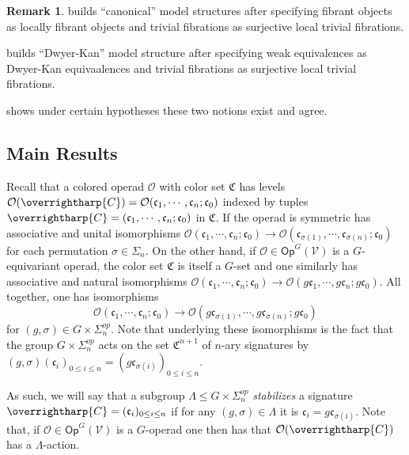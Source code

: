 \documentclass[a4paper,10pt
,draft
]{article}%
\numberwithin{equation}{section}
\numberwithin{figure}{section}
\theoremstyle{definition} %
\newtheorem{remark}[equation]{Remark}%
\newcommand{\vect}[1]{\text{\overrightharp{\ensuremath{#1}}}}
\newcommand{\V}{\ensuremath{\mathcal V}}
\renewcommand{\O}{\ensuremath{\mathcal O}}
\newcommand{\1}{\ensuremath{\mathbbm 1}}%
\begin{document}
  \begin{remark}
        \cite{BM13} builds ``canonical'' model structures after specifying
        fibrant objects as locally fibrant objects and
        trivial fibrations as surjective local trivial fibrations.
        
        \cite{Mur15} builds ``Dwyer-Kan'' model structure after specifying
        weak equivalences as Dwyer-Kan equivaalences and
        trivial fibrations as surjective local trivial fibrations.
        
        \cite{Sta14} shows under certain hypotheses these two notions exist and agree.
\end{remark}





\subsection{Main Results}


Recall that a colored operad $\O$
with color set $\mathfrak{C}$ has levels 
$
\O(\vect{C})=
\O(\mathfrak{c}_1,\cdots,\mathfrak{c}_n;\mathfrak{c}_0)$
indexed by tuples 
$\vect{C} = (\mathfrak{c}_1,\cdots,\mathfrak{c}_n;\mathfrak{c}_0)$
in $\mathfrak{C}$.
If the operad is symmetric has associative and unital isomorphisms
$
\O(\mathfrak{c}_1,\cdots,\mathfrak{c}_n;\mathfrak{c}_0) \to 
\O(\mathfrak{c}_{\sigma(1)},\cdots,\mathfrak{c}_{\sigma(n)};\mathfrak{c}_0)
$
for each permutation $\sigma \in \Sigma_n$.
On the other hand, if 
$\O \in \mathsf{Op}^G(\V)$
is a $G$-equivariant operad, 
the color set $\mathfrak{C}$ is itself a $G$-set
and one similarly has associative and natural isomorphisms
$
\O(\mathfrak{c}_1,\cdots,\mathfrak{c}_n;\mathfrak{c}_0) \to 
\O(g\mathfrak{c}_{1},\cdots,g\mathfrak{c}_{n};g\mathfrak{c}_0)
$.
All together, one has isomorphisms
\[
\O(\mathfrak{c}_1,\cdots,\mathfrak{c}_n;\mathfrak{c}_0)
\to 
\O(g \mathfrak{c}_{\sigma(1)},\cdots,g \mathfrak{c}_{\sigma(n)};g\mathfrak{c}_0)
\]
for $(g,\sigma) \in G \times \Sigma_n^{op}$.
Note that underlying these isomorphisms is the fact that
the group
$G \times \Sigma_n^{op}$
acts on the set $\mathfrak{C}^{n+1}$ of $n$-ary signatures by 
$(g,\sigma) (\mathfrak{c}_i)_{0\leq i \leq n}
= (g \mathfrak{c}_{\sigma(i)})_{0\leq i \leq n}$.

As such, we will say that a subgroup 
$\Lambda \leq G \times \Sigma_n^{op}$
\emph{stabilizes} a signature $\vect{C}=(\mathfrak{c}_i)_{0 \leq i \leq n}$
if for any 
$(g,\sigma) \in \Lambda$ it is 
$\mathfrak{c}_i = g \mathfrak{c}_{\sigma(i)}$.
Note that, if $\O \in \mathsf{Op}^G(\V)$
is a $G$-operad one then has that
$\O(\vect{C})$ has a $\Lambda$-action.
\end{document}
